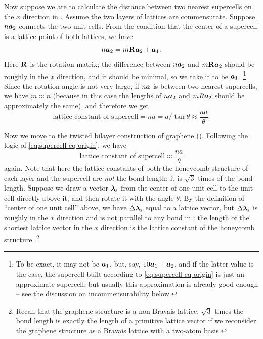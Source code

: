 \documentclass[hyperref, a4paper]{article}
\begin{document}
Now suppose we are to calculate the distance between two nearest supercells 
on the $x$ direction in .
Assume the two layers of lattices are commensurate.
Suppose $n \vb*{a}_2$ connects the two unit cells.
From the condition that the center of a supercell is 
a lattice point of both lattices, 
we have
\begin{equation}
    n \vb*{a}_2 = m \vb{R} \vb*{a}_2 + \vb*{a}_1.
    \label{eq:supercell-eq-origin}
\end{equation}
Here $\vb{R}$ is the rotation matrix;
the difference between $n \vb*{a}_2$ and $m \vb{R} \vb*{a}_2$ 
should be roughly in the $x$ direction, 
and it should be minimal, so we take it to be $\vb*{a}_1$.%
\footnote{
    To be exact, it may not be $\vb*{a}_1$, but, say, $10 \vb*{a}_1 + \vb*{a}_2$,
    and if the latter value is the case,
    the supercell built according to \eqref{eq:supercell-eq-origin} is just an approximate supercell; 
    but usually this approximation is already good enough -- 
    see the discussion on incommensurability below.
}
Since the rotation angle is not very large,
if $n \vb*{a}$ is between two nearest supercells, 
we have $m \approx n$
(because in this case the lengths of $n \vb*{a}_2$ and $m R \vb*{a}_2$ should be approximately the same),
and therefore we get 
\begin{equation}
    \text{lattice constant of supercell} = n a = a / \tan \theta \approx \frac{na}{\theta}.
    \label{eq:supercell-sq}
\end{equation}

Now we move to the twisted bilayer construction of graphene ().
Following the logic of \eqref{eq:supercell-eq-origin},
we have 
\begin{equation}
    \text{lattice constant of supercell} \approx \frac{na}{\theta}
\end{equation}
again. Note that here the lattice constants of both the honeycomb structure of each layer and the supercell 
are \emph{not} the bond length:
it is $\sqrt{3}$ times of the bond length.
Suppose we draw a vector $\vb*{\lambda}_{\text{s}}$ 
from the center of one unit cell to the unit cell directly above it,
and then rotate it with the angle $\theta$.
By the definition of ``center of one unit cell'' above,
we have $\Delta \vb*{\lambda}_{\text{s}}$ equal to a lattice vector,
but $\Delta \vb*{\lambda}_{\text{s}}$ is roughly in the $x$ direction 
and is not parallel to any bond in :
the length of the shortest lattice vector in the $x$ direction is 
the lattice constant of the honeycomb structure.%
\footnote{
    Recall that the graphene structure is a non-Bravais lattice.
    $\sqrt{3}$ times the bond length is exactly the length of a primitive lattice vector 
    if we reconsider the graphene structure as a Bravais lattice 
    with a two-atom basis.
}
\end{document}
